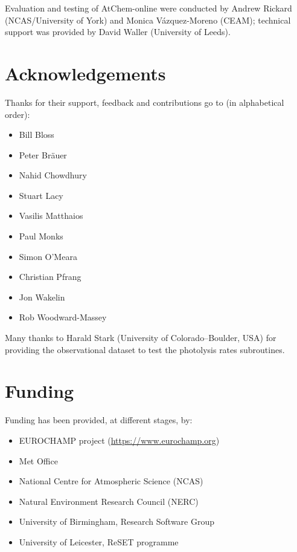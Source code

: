 Evaluation and testing of AtChem-online were conducted by Andrew Rickard (NCAS/University of
York) and Monica V{\'a}zquez-Moreno (CEAM); technical support was provided by David Waller
(University of Leeds).

\section{Acknowledgements} \label{sec:acknowledgements}

Thanks for their support, feedback and contributions go to (in alphabetical order):

\begin{itemize}
\item Bill Bloss
\item Peter Br{\"a}uer
\item Nahid Chowdhury
\item Stuart Lacy
\item Vasilis Matthaios
\item Paul Monks
\item Simon O'Meara
\item Christian Pfrang
\item Jon Wakelin
\item Rob Woodward-Massey
\end{itemize}

Many thanks to Harald Stark (University of Colorado--Boulder, USA) for providing the
observational dataset to test the photolysis rates subroutines.

\section{Funding} \label{sec:funding}

Funding has been provided, at different stages, by:

\begin{itemize}
\item EUROCHAMP project (\url{https://www.eurochamp.org})
\item Met Office
\item National Centre for Atmospheric Science (NCAS)
\item Natural Environment Research Council (NERC)
\item University of Birmingham, Research Software Group
\item University of Leicester, ReSET programme
\end{itemize}
